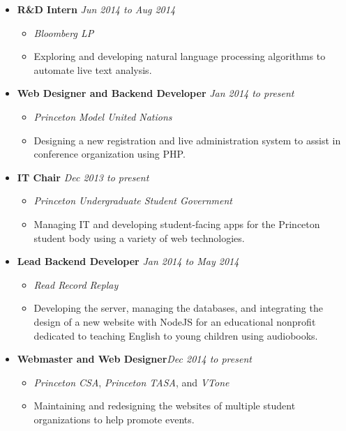 \documentclass[11pt]{article}
\begin{document}
\begin{itemize}[nolistsep,topsep=0pt, label=]
\itemsep0.33em
\item \textbf{R\&D Intern}  \hfill \emph{Jun 2014 to Aug 2014}
\begin{itemize}[nolistsep,topsep=0pt, label=]
\item \emph{Bloomberg LP} 
\item Exploring and developing natural language processing algorithms to automate live text analysis.
\end{itemize}

\item \textbf{Web Designer and Backend Developer} \hfill\emph{Jan 2014 to present}
\begin{itemize}[nolistsep,topsep=0pt, label=]
\item \emph{Princeton Model United Nations}  
\item Designing a new registration and live administration system to assist in conference organization using PHP.
\end{itemize}

\item \textbf{IT Chair}  \hfill \emph{Dec 2013 to present}
\begin{itemize}[nolistsep,topsep=0pt, label=]
\item \emph{Princeton Undergraduate Student Government} 
\item Managing IT and developing student-facing apps for the Princeton student body using a variety of web technologies.
\end{itemize}

\item \textbf{Lead Backend Developer}  \hfill\emph{Jan 2014 to May 2014}
\begin{itemize}[nolistsep,topsep=0pt, label=]
\item \emph{Read Record Replay}
\item Developing the server, managing the databases, and integrating the design of a new website with NodeJS for an educational nonprofit dedicated to teaching English to young children using audiobooks.
\end{itemize}

\item \textbf{Webmaster and Web Designer}\hfill \emph{Dec 2014 to present}
\begin{itemize}[nolistsep,topsep=0pt, label=]
\item \emph{Princeton CSA}, \emph{Princeton TASA}, and \emph{VTone}
\item Maintaining and redesigning the websites of multiple student organizations to help promote events.
\end{itemize}


\end{itemize}
\end{document}
